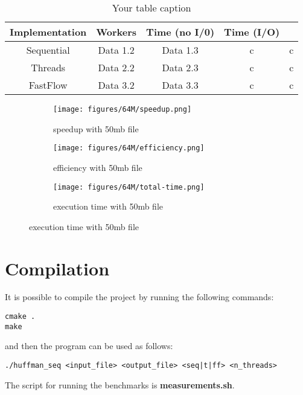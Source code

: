 \documentclass{article}
\begin{document}
\begin{table}[h]
\centering
\begin{tabular}{|c|c|c|c|c|}
\hline
Implementation & Workers & Time (no I/0) & Time (I/O) \\
\hline
Sequential & Data 1.2 & Data 1.3 & c & c \\
Threads & Data 2.2 & Data 2.3 & c & c \\
FastFlow & Data 3.2 & Data 3.3 & c & c \\
\hline
\end{tabular}
\caption{Your table caption}
\label{tab:my_label}
\end{table}

\begin{figure}[H]
    \begin{subfigure}{0.5\textwidth}
        \centering
        \texttt{[image: figures/64M/speedup.png]}
        \caption{speedup with 50mb file}
    \end{subfigure}
    \begin{subfigure}{0.5\textwidth}
        \centering
        \texttt{[image: figures/64M/efficiency.png]}
        \caption{efficiency with 50mb file}
    \end{subfigure}
    \begin{subfigure}{0.5\textwidth}
        \centering
        \texttt{[image: figures/64M/total-time.png]}
        \caption{execution time with 50mb file}
    \end{subfigure}
\end{figure}

\break
\section{Compilation}
It is possible to compile the project by running the following commands:
\begin{verbatim}
cmake .
make
\end{verbatim}

and then the program can be used as follows:
\begin{verbatim}
./huffman_seq <input_file> <output_file> <seq|t|ff> <n_threads>
\end{verbatim}

The script for running the benchmarks is \textbf{measurements.sh}.
\end{document}
